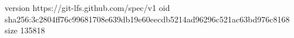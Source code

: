 version https://git-lfs.github.com/spec/v1
oid sha256:3c2804ff76c99681708e639db19e60eecdb5214ad96296c521ac63bd976c8168
size 135818

